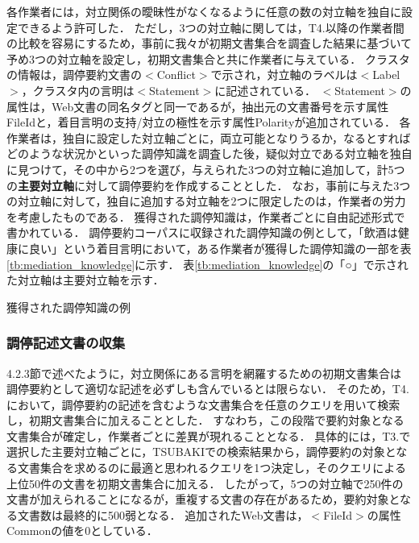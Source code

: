 \documentclass[japanese]{jnlp_1.4}
\begin{document}
各作業者には，対立関係の曖昧性がなくなるように任意の数の対立軸を独自に設定できるよう許可した．
ただし，3つの対立軸に関しては，T4.以降の作業者間の比較を容易にするため，事前に我々が初期文書集合を調査した結果に基づいて{予め}3つの対立軸を設定し，初期文書集合と共に作業者に与えている．
クラスタの情報は，調停要約文書の{\sf $<$Conflict$>$}で示され，対立軸のラベルは{\sf $<$Label$>$}，クラスタ内の言明は{\sf $<$Statement$>$}に記述されている．
{\sf $<$Statement$>$}の属性は，Web文書の同名タグと同一であるが，抽出元の文書番号を示す属性{\sf FileId}と，着目言明の支持/対立の極性を示す属性{\sf Polarity}が追加されている．
各作業者は，独自に設定した対立軸ごとに，両立可能となりうるか，なるとすればどのような状況かといった調停知識を調査した後，疑似対立である対立軸を独自に見つけて，その中から2つを選び，与えられた3つの対立軸に追加して，計5つの{\bf {主要}対立軸}に対して調停要約を作成することとした．
なお，事前に与えた3つの対立軸に対して，独自に追加する対立軸を2つに限定したのは，作業者の労力を考慮したものである．
獲得された調停知識は，作業者ごとに自由記述形式で書かれ{ている}．
調停要約コーパスに収録された調停知識の例として，「飲酒は健康に良い」という着目言明において，ある作業者が獲得した調停知識の一部を表\ref{tb:mediation_knowledge}に示す．
表\ref{tb:mediation_knowledge}の「○」で示された対立軸は主要対立軸を示す．

\begin{table}[t]
 \caption{獲得された調停知識の例}
 \label{tb:mediation_knowledge}

\end{table}


\subsubsection{調停記述文書の収集}

4.2.3節で述べたように，{対立関係}にある言明を網羅するための初期文書集合は調停要約として適切な記述を必ずしも含んでいるとは限らない．
そのため，T4.において，調停要約の記述を含むような文書集合を任意のクエリを用いて検索し，初期文書集合に加えることとした．
すなわち，この段階で要約対象となる文書集合が確定し，作業者ごとに差異が現れることとなる．
具体的には，T3.で選択した{主要}対立軸ごとに，TSUBAKIでの検索結果から，調停要約の対象となる文書集合を求めるのに最適と思われるクエリを1つ決定し，そのクエリによる上位50件の文書を初期文書集合に加える．
したがって，5つの対立軸で250件の文書が加えられることになるが，重複する文書の存在があるため，要約対象となる文書数は最終的に500弱となる．
追加されたWeb文書は，{\sf $<$FileId$>$}の属性{\sf Common}の値を0としている．
\end{document}
